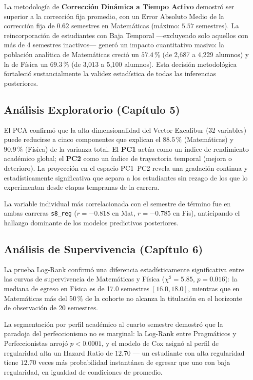 La metodología de \textbf{Corrección Dinámica a Tiempo Activo} demostró ser superior a la
corrección fija promedio, con un Error Absoluto Medio de la corrección fija de $0.62$
semestres en Matemáticas (máximo: $5.57$ semestres). La reincorporación de estudiantes con
Baja Temporal —excluyendo solo aquellos con más de 4 semestres inactivos— generó un impacto
cuantitativo masivo: la población analítica de Matemáticas creció un $\mathbf{57.4\,\%}$
(de 2{,}687 a 4{,}229 alumnos) y la de Física un $\mathbf{69.3\,\%}$ (de 3{,}013 a
5{,}100 alumnos). Esta decisión metodológica fortaleció sustancialmente la validez estadística
de todas las inferencias posteriores.

\subsection{Análisis Exploratorio (Capítulo 5)}

El PCA confirmó que la alta dimensionalidad del Vector Excalibur (32 variables) puede reducirse
a cinco componentes que explican el $88.5\,\%$ (Matemáticas) y $90.9\,\%$ (Física) de la
varianza total. El \textbf{PC1} actúa como un índice de rendimiento académico global; el
\textbf{PC2} como un índice de trayectoria temporal (mejora o deterioro). La proyección en el
espacio PC1--PC2 revela una gradación continua y estadísticamente significativa que separa a
los estudiantes sin rezago de los que lo experimentan desde etapas tempranas de la carrera.

\noindent
La variable individual más correlacionada con el semestre de término fue en ambas carreras
\texttt{s8\_reg} ($r = -0.818$ en Mat, $r = -0.785$ en Fís), anticipando el hallazgo dominante
de los modelos predictivos posteriores.

\subsection{Análisis de Supervivencia (Capítulo 6)}

La prueba Log-Rank confirmó una diferencia estadísticamente significativa entre las curvas de
supervivencia de Matemáticas y Física ($\chi^2 = 5.85$, $p = 0.016$): la mediana de egreso en
Física es de 17.0 semestres $[16.0, 18.0]$, mientras que en Matemáticas más del 50\,\% de la
cohorte no alcanza la titulación en el horizonte de observación de 20 semestres.

\noindent
La segmentación por perfil académico al cuarto semestre demostró que la paradoja del
perfeccionismo no es marginal: la Log-Rank entre Pragmáticos y Perfeccionistas arrojó
$p < 0.0001$, y el modelo de Cox asignó al perfil de regularidad alta un Hazard Ratio de
$12.70$ — un estudiante con alta regularidad tiene $12.70$ veces más probabilidad instantánea
de egresar que uno con baja regularidad, en igualdad de condiciones de promedio.

